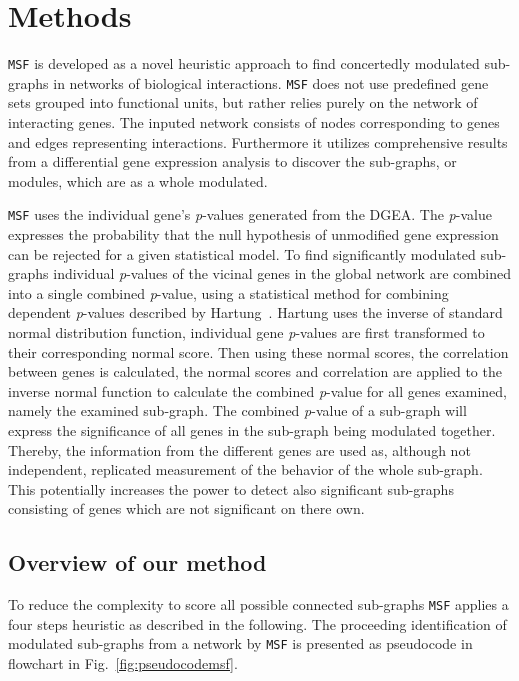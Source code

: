 \documentclass[10pt,a4paper,twocolumn]{article}
\begin{document}
\section*{Methods}
\texttt{MSF} is developed as a novel heuristic approach to
find concertedly modulated sub-graphs in networks of biological interactions.
\texttt{MSF} does not use predefined gene sets grouped into
functional units, but rather relies purely on the network of interacting genes.
The inputed network consists of nodes corresponding to genes and edges
representing interactions. Furthermore it utilizes comprehensive results from a
differential gene expression analysis to discover the sub-graphs, or modules, which
are as a whole modulated.

\texttt{MSF} uses the individual gene's \textit{p}-values generated
from the DGEA. The \textit{p}-value expresses the probability that the
null hypothesis of unmodified gene expression can be rejected for a
given statistical model. To find significantly modulated sub-graphs
individual \textit{p}-values of the vicinal genes in the global
network are combined into a single combined \textit{p}-value, using a
statistical method for combining dependent \textit{p}-values described
by Hartung~\cite{Hartung}. Hartung uses the inverse of standard normal
distribution function, individual gene \textit{p}-values are first
transformed to their corresponding normal score. Then using these
normal scores, the correlation between genes is calculated, the normal
scores and correlation are applied to the inverse normal function to
calculate the combined \textit{p}-value for all genes examined, namely the
examined sub-graph. The combined \textit{p}-value of a sub-graph will
express the significance of all genes in the sub-graph being modulated
together. Thereby, the information from the different genes are used as,
although not independent, replicated measurement of the behavior of the whole
sub-graph. This potentially increases the power to detect also significant
sub-graphs consisting of genes which are not significant on there own.
\newline

\subsection*{Overview of our method}

To reduce the complexity to score all possible connected sub-graphs
\texttt{MSF} applies a four steps heuristic as described in the
following. The proceeding identification of modulated sub-graphs from
a network by \texttt{MSF} is presented as pseudocode in flowchart in
Fig.~\ref{fig:pseudocodemsf}. 
\end{document}
